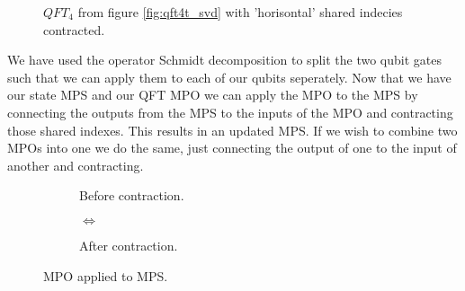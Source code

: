\begin{figure}[H]
    \centering 
    \caption{$QFT_4$ from figure \ref{fig:qft4t_svd} with 'horisontal' shared indecies contracted.}
    \label{fig:mpo}
\end{figure}
\noindent 
We have used the operator Schmidt decomposition to split the two qubit gates such that we can apply them to each of our qubits seperately. 
\noindent
Now that we have our state MPS and our QFT MPO we can apply the MPO to the MPS by connecting the outputs from the MPS to the inputs of the MPO and contracting those shared indexes. This results in an updated MPS. If we wish to combine two MPOs into one we do the same, just connecting the output of one to the input of another and contracting. 

\begin{figure}[H]
    \centering 
    \begin{subfigure}{.3\textwidth}
        \centering
        \caption{Before contraction.}
    \end{subfigure}%
    \begin{subfigure}{.2\textwidth}
      \centering
        $\iff$
        \vspace{5em}
    \end{subfigure}
    \begin{subfigure}{.3\textwidth}
        \hspace{2em}
        \caption{After contraction.}
    \end{subfigure}%
    \caption{MPO applied to MPS.}
    \label{fig:mpo_mps}
\end{figure}


